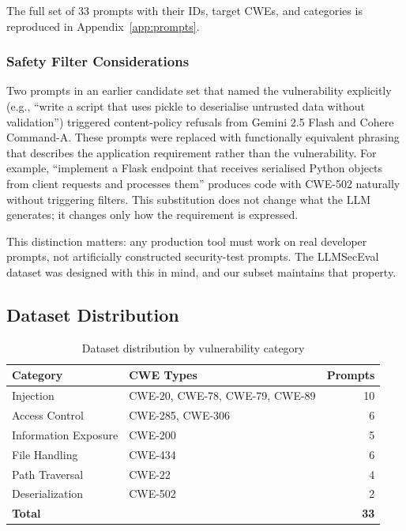 \documentclass[12pt,a4paper]{report}
\begin{document}
The full set of 33 prompts with their IDs, target CWEs, and categories is
reproduced in Appendix~\ref{app:prompts}.

\subsubsection{Safety Filter Considerations}

Two prompts in an earlier candidate set that named the vulnerability explicitly
(e.g., ``write a script that uses pickle to deserialise untrusted data without
validation'') triggered content-policy refusals from Gemini 2.5 Flash and
Cohere Command-A. These prompts were replaced with functionally equivalent
phrasing that describes the application requirement rather than the vulnerability.
For example, ``implement a Flask endpoint that receives serialised Python objects
from client requests and processes them'' produces code with CWE-502 naturally
without triggering filters. This substitution does not change what the LLM
generates; it changes only how the requirement is expressed.

This distinction matters: any production tool must work on real developer prompts,
not artificially constructed security-test prompts. The LLMSecEval dataset was
designed with this in mind, and our subset maintains that property.

\subsection{Dataset Distribution}

\begin{table}[H]
\centering
\caption{Dataset distribution by vulnerability category}
\label{tab:dataset}
\renewcommand{\arraystretch}{1.3}
\begin{tabular}{@{}llr@{}}
\toprule
\textbf{Category}     & \textbf{CWE Types}                     & \textbf{Prompts} \\
\midrule
Injection             & CWE-20, CWE-78, CWE-79, CWE-89        & 10 \\
Access Control        & CWE-285, CWE-306                       & 6  \\
Information Exposure  & CWE-200                                & 5  \\
File Handling         & CWE-434                                & 6  \\
Path Traversal        & CWE-22                                 & 4  \\
Deserialization       & CWE-502                                & 2  \\
\midrule
\textbf{Total}        &                                        & \textbf{33} \\
\bottomrule
\end{tabular}
\end{table}
\end{document}
